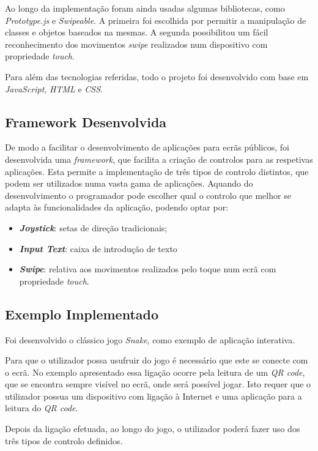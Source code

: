 \documentclass[9pt,a4paper]{extarticle}
\begin{document}
\begin{multicols}{2}
Ao longo da implementação foram ainda usadas algumas bibliotecas, como \textit{Prototype.js} e \textit{Swipeable}. A primeira foi escolhida por permitir a manipulação de classes e objetos baseados na mesmas. A segunda possibilitou um fácil reconhecimento dos movimentos \textit{swipe} realizados num dispositivo com propriedade \textit{touch}.

Para além das tecnologias referidas, todo o projeto foi desenvolvido com base em \textit{JavaScript}, \textit{HTML} e \textit{CSS}.

\subsection{Framework Desenvolvida} 

De modo a facilitar o desenvolvimento de aplicações para ecrãs públicos, foi desenvolvida uma \textit{framework}, que facilita a criação de controlos para as respetivas aplicações.
Esta permite a implementação de três tipos de controlo distintos, que podem ser utilizados numa vasta gama de aplicações.
Aquando do desenvolvimento o programador pode escolher qual o controlo que melhor se adapta às funcionalidades da aplicação, podendo optar por:

\begin{itemize}
\item \textbf{\textit{Joystick}}: setas de direção tradicionais;
\item \textbf{\textit{Input Text}}: caixa de introdução de texto
\item \textbf{\textit{Swipe}}: relativa aos movimentos realizados pelo toque num ecrã com propriedade \textit{touch}.
\end{itemize}

\subsection{Exemplo Implementado}

Foi desenvolvido o clássico jogo \textit{Snake}, como exemplo de aplicação interativa. 

Para que o utilizador possa usufruir do jogo é necessário que este se conecte com o ecrã. No exemplo apresentado essa ligação ocorre pela leitura de um \textit{QR code}, que se encontra sempre visível no ecrã, onde será possível jogar. Isto requer que o utilizador possua um dispositivo com ligação à Internet e uma aplicação para a leitura do \textit{QR code}.

Depois da ligação efetuada, ao longo do jogo, o utilizador poderá fazer uso dos três tipos de controlo definidos. 


\end{multicols}
\end{document}
